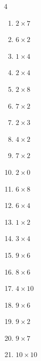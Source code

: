 \begin{multicols}{4}
\begin{enumerate}
  \item $2\times 7$
        \phantom{$=14$}

  \item $6\times 2$
        \phantom{$=12$}

  \item $1\times 4$
        \phantom{$=4$}

  \item $2\times 4$
        \phantom{$=8$}

  \item $2\times 8$
        \phantom{$=16$}

  \item $7\times 2$
        \phantom{$=14$}

  \item $2\times 3$
        \phantom{$=6$}

  \item $4\times 2$
        \phantom{$=8$}

  \item $7\times 2$
        \phantom{$=14$}

  \item $2\times 0$
        \phantom{$=0$}

  \item $6\times 8$
        \phantom{$=48$}

  \item $6\times 4$
        \phantom{$=24$}

  \item $1\times 2$
        \phantom{$=2$}

  \item $3\times 4$
        \phantom{$=12$}

  \item $9\times 6$
        \phantom{$=54$}

  \item $8\times 6$
        \phantom{$=48$}

  \item $4\times 10$
        \phantom{$=40$}

  \item $9\times 6$
        \phantom{$=54$}

  \item $9\times 2$
        \phantom{$=18$}

  \item $9\times 7$
        \phantom{$=63$}

  \item $10\times 10$
        \phantom{$=100$}


\end{enumerate}
\end{multicols}

